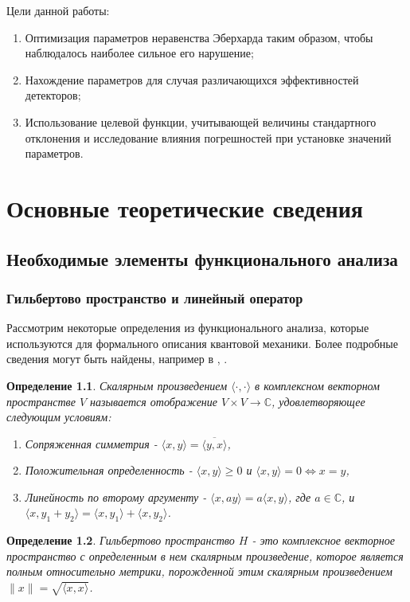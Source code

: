 \documentclass[%
master,         %
subf,           %
href,           %
,times         %
]{disser}
\numberwithin{equation}{section}
\numberwithin{figure}{section}
\newtheorem{definition}{Определение}[section]
\begin{document}
Цели данной работы:
\begin{enumerate}
\item Оптимизация параметров неравенства Эберхарда таким образом, чтобы наблюдалось наиболее сильное его нарушение;
\item Нахождение параметров для случая различающихся эффективностей детекторов;
\item Использование целевой функции, учитывающей величины стандартного отклонения и исследование влияния погрешностей при установке значений параметров.
\end{enumerate}


\chapter{Основные теоретические сведения}

\section{Необходимые элементы функционального анализа}
\subsection{Гильбертово пространство и линейный оператор}
Рассмотрим некоторые определения из функционального анализа, которые используются для формального описания квантовой механики. Более подробные сведения могут быть найдены, например в \cite{advanced_la}, \cite{reed}.

\begin{definition}
Скалярным произведением $\langle\cdot,\cdot\rangle$ в комплексном векторном пространстве $V$ называется отображение $V\times V \to \mathbb{C}$, удовлетворяющее следующим условиям:
\begin{enumerate}
\item Сопряженная симметрия - $\langle x, y\rangle = \overline{\langle y, x\rangle}$,
\item Положительная определенность - $\langle x, y\rangle \geq 0$ и $\langle x, y\rangle = 0 \Leftrightarrow x = y$,
\item Линейность по второму аргументу - $\langle x, ay\rangle = a\langle x, y\rangle$, где $a\in\mathbb{C}$, и $\langle x, y_1 + y_2\rangle = \langle x, y_1\rangle + \langle x, y_2\rangle$.
\end{enumerate}
\end{definition}

\begin{definition}
Гильбертово пространство $H$ - это комплексное векторное пространство с определенным в нем скалярным произведение, которое является полным относительно метрики, порожденной этим скалярным произведением $\|x\| = \sqrt{\langle x, x\rangle}$.
\end{definition}
\end{document}
